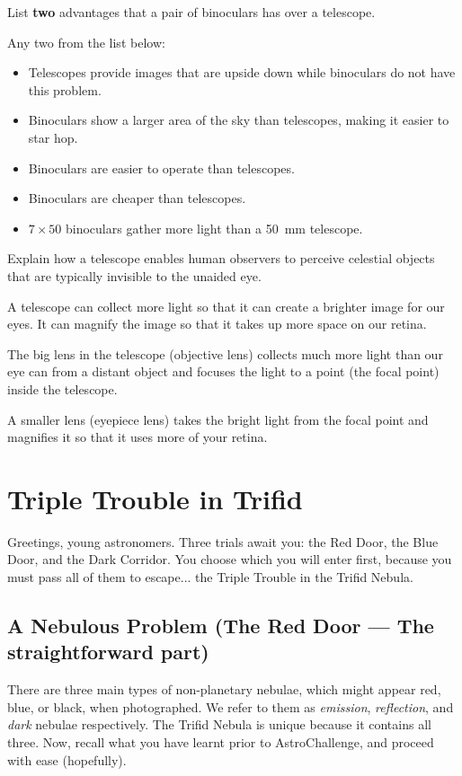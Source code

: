 \documentclass[a4paper,11pt,draft]{exam}
\begin{document}
\begin{questions}
\question[2]
	List \textbf{two} advantages that a pair of binoculars has over a telescope.
	\droppoints
	\begin{solution}
		Any two from the list below:
		\begin{itemize}
			\item Telescopes provide images that are upside down while binoculars do not have this problem.
			\item Binoculars show a larger area of the sky than telescopes, making it easier to star hop.
			\item Binoculars are easier to operate than telescopes.
			\item Binoculars are cheaper than telescopes.
			\item $7 \times 50$ binoculars gather more light than a \SI{50}{\milli\metre} telescope.
		\end{itemize}
	\end{solution}
	
\question[2]
	Explain how a telescope enables human observers to perceive celestial objects that are typically invisible to the unaided eye.
	\droppoints
	\begin{solution}
		A telescope can collect more light so that it can create a brighter image for our eyes. It can magnify the image so that it takes up more space on our retina.
		
		The big lens in the telescope (objective lens) collects much more light than our eye can from a distant object and focuses the light to a point (the focal point) inside the telescope.
		
		A smaller lens (eyepiece lens) takes the bright light from the focal point and magnifies it so that it uses more of your retina.
	\end{solution}
	
\end{questions}

\newpage
\section{Triple Trouble in Trifid}
Greetings, young astronomers. Three trials await you: the Red Door, the Blue Door, and the Dark Corridor. You choose which you will enter first, because you must pass all of them to escape... the Triple Trouble in the Trifid Nebula.
\subsection*{A Nebulous Problem (The Red Door --- The straightforward part)}
There are three main types of non-planetary nebulae, which might appear red, blue, or black, when photographed. We refer to them as \textit{emission}, \textit{reflection}, and \textit{dark} nebulae respectively. The Trifid Nebula is unique because it contains all three. Now, recall what you have learnt prior to AstroChallenge, and proceed with ease (hopefully). 
\end{document}
